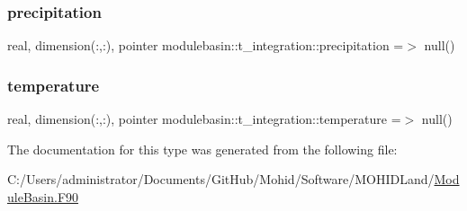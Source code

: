 \subsubsection{\texorpdfstring{precipitation}{precipitation}}
{\footnotesize\ttfamily real, dimension(\+:,\+:), pointer modulebasin\+::t\+\_\+integration\+::precipitation =$>$ null()\hspace{0.3cm}{\ttfamily [private]}}

\mbox{\label{structmodulebasin_1_1t__integration_a3dff24459ef4c95dc209ba5c8af322bd}} 
\subsubsection{\texorpdfstring{temperature}{temperature}}
{\footnotesize\ttfamily real, dimension(\+:,\+:), pointer modulebasin\+::t\+\_\+integration\+::temperature =$>$ null()\hspace{0.3cm}{\ttfamily [private]}}



The documentation for this type was generated from the following file\+:\begin{DoxyCompactItemize}
\item 
C\+:/\+Users/administrator/\+Documents/\+Git\+Hub/\+Mohid/\+Software/\+M\+O\+H\+I\+D\+Land/\mbox{\hyperlink{_module_basin_8_f90}{Module\+Basin.\+F90}}\end{DoxyCompactItemize}
